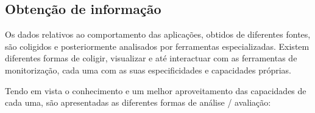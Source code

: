 
\subsection{Obtenção de informação}\label{sect:instrumentation_overview}
% 
% 
% 
% 
% 
% 
% 

Os dados relativos ao comportamento das aplicações, obtidos de diferentes fontes, são coligidos e posteriormente analisados por ferramentas especializadas.
Existem diferentes formas de coligir, visualizar e até interactuar com as ferramentas de monitorização, cada uma com as suas especificidades e capacidades próprias.

Tendo em vista o conhecimento e um melhor aproveitamento das capacidades de cada uma, são apresentadas as diferentes formas de análise / avaliação:

